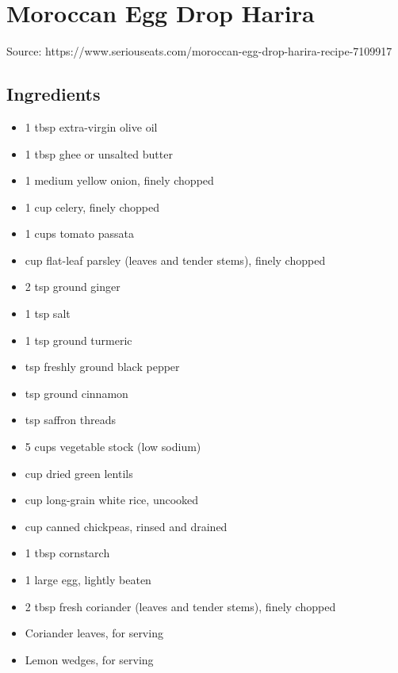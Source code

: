 \section{Moroccan Egg Drop Harira}


Source: https://www.seriouseats.com/moroccan-egg-drop-harira-recipe-7109917

\subsection{Ingredients}

\begin{itemize}
    \item 1 tbsp extra-virgin olive oil
    \item 1 tbsp ghee or unsalted butter
    \item 1 medium yellow onion, finely chopped
    \item 1 cup celery, finely chopped
    \item 1 cups tomato passata
    \item {} cup flat-leaf parsley (leaves and tender stems), finely chopped
    \item 2 tsp ground ginger
    \item 1 tsp salt
    \item 1 tsp ground turmeric
    \item {} tsp freshly ground black pepper
    \item {} tsp ground cinnamon
    \item {} tsp saffron threads
    \item 5 cups vegetable stock (low sodium)
    \item {} cup dried green lentils
    \item {} cup long-grain white rice, uncooked
    \item {} cup canned chickpeas, rinsed and drained
    \item 1 tbsp cornstarch
    \item 1 large egg, lightly beaten
    \item 2 tbsp fresh coriander (leaves and tender stems), finely chopped
    \item Coriander leaves, for serving
    \item Lemon wedges, for serving
\end{itemize}

